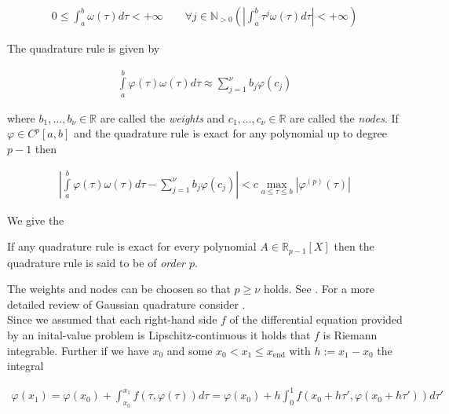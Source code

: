\begin{gather*}
	0 \leqslant \int_a^b \omega(\tau) d\tau < +\infty \qquad  \forall j \in \mathbb{N}_{>0}\left(\left\vert \int_a^b \tau ^j\omega(\tau) d\tau\right\vert < +\infty\right) 
\end{gather*}

The quadrature rule is given by

\begin{gather}
	\boxed{\int\limits_a^b \varphi(\tau)\omega(\tau) d\tau \approx \sum\limits_{j = 1}^\nu b_j \varphi(c_j)}
\end{gather}

where $b_1,\hdots,b_\nu \in \mathbb{R}$ are called the \emph{weights} and $c_1,\hdots,c_\nu \in \mathbb{R}$ are called the \emph{nodes}. If $\varphi \in C^p[a,b]$ and the quadrature rule is exact for any polynomial up to degree $p - 1$ then

\begin{gather}
	\left\vert \int\limits_{a}^b \varphi(\tau)\omega(\tau)d\tau - \sum\limits_{j = 1}^\nu b_j\varphi(c_j)\right\vert < c \max\limits_{a \leqslant \tau \leqslant b} \left\vert \varphi^{(p)}(\tau) \right\vert
\end{gather} 

We give the

\begin{mdframed}
	\begin{definition}
		If any quadrature rule is exact for every polynomial $A \in \mathbb{R}_{p-1}[X]$ then the quadrature rule is said to be of \emph{order $p$}.
	\end{definition}
\end{mdframed}

The weights and nodes can be choosen so that $p \geqslant \nu$ holds. See \cite[34--37]{Numerical_Analysis_ISERLES}. For a more detailed review of Gaussian quadrature consider \cite[187--196]{Numerische_Mathematik_1_HOPPE}.\\

Since we assumed that each right-hand side $f$ of the differential equation provided by an inital-value problem is Lipschitz-continuous it holds that $f$ is Riemann integrable. Further if we have $x_0$ and some $x_0 < x_1 \leqslant x_{\mathrm{end}}$ with $h := x_1 - x_0$ the integral

\begin{gather}
	\boxed{\varphi(x_{1}) = \varphi(x_0) + \int_{x_0}^{x_1} f\left( \tau, \varphi(\tau) \right) d\tau = \varphi(x_0) + h \int_0^1 f\left( x_0 + h\tau', \varphi\left( x_0 + h\tau' \right) \right) d\tau'}
\end{gather}

